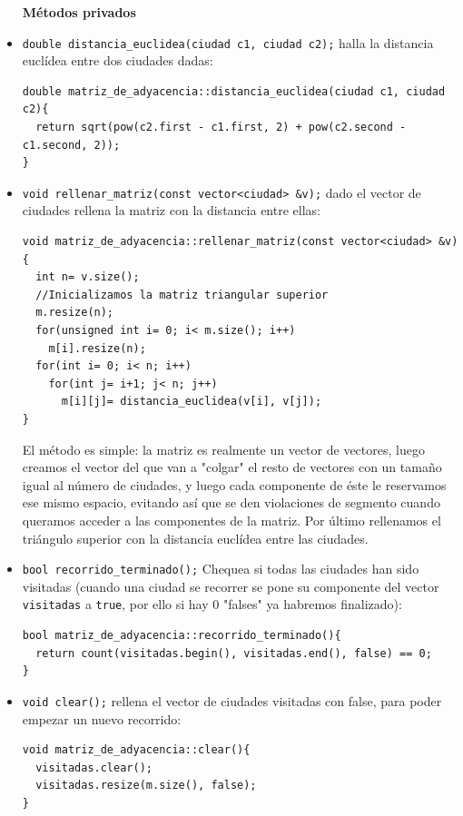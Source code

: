 \documentclass[12pt]{article}
\begin{document}
\begin{itemize}[wide, nosep, labelindent = 0pt, topsep = 1ex]
\item[\textbf{Métodos privados}] 
\item \verb|double distancia_euclidea(ciudad c1, ciudad c2);| halla la distancia euclídea entre dos ciudades dadas:
\begin{lstlisting}
double matriz_de_adyacencia::distancia_euclidea(ciudad c1, ciudad c2){
  return sqrt(pow(c2.first - c1.first, 2) + pow(c2.second - c1.second, 2));
}
\end{lstlisting} 
\item \verb|void rellenar_matriz(const vector<ciudad> &v);| dado el vector de ciudades rellena la matriz con la distancia entre ellas: 
\begin{lstlisting}
void matriz_de_adyacencia::rellenar_matriz(const vector<ciudad> &v){
  int n= v.size();
  //Inicializamos la matriz triangular superior
  m.resize(n);
  for(unsigned int i= 0; i< m.size(); i++)
    m[i].resize(n);
  for(int i= 0; i< n; i++)
    for(int j= i+1; j< n; j++)
      m[i][j]= distancia_euclidea(v[i], v[j]);
}
\end{lstlisting}
El método es simple: la matriz es realmente un vector de vectores, luego creamos el vector del que van a "colgar" el resto de vectores con un tamaño igual al número de ciudades, y luego cada componente de éste le reservamos ese mismo espacio, evitando así que se den violaciones de segmento cuando queramos acceder a las componentes de la matriz. Por último rellenamos el triángulo superior con la distancia euclídea entre las ciudades.
\item  \verb|bool recorrido_terminado();| Chequea si todas las ciudades han sido visitadas (cuando una ciudad se recorrer se pone su componente del vector \verb|visitadas| a \verb|true|, por ello si hay 0 "falses" ya habremos finalizado): 
\begin{lstlisting}
bool matriz_de_adyacencia::recorrido_terminado(){
  return count(visitadas.begin(), visitadas.end(), false) == 0;
}
\end{lstlisting}
 
\item \verb|void clear();| rellena el vector de ciudades visitadas con false, para poder empezar un nuevo recorrido:
\begin{lstlisting}
void matriz_de_adyacencia::clear(){
  visitadas.clear();
  visitadas.resize(m.size(), false);
}
\end{lstlisting}
\end{itemize}
\end{document}
